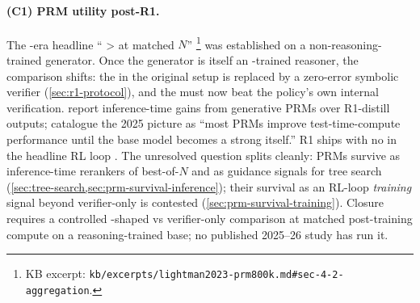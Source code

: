 \paragraph{(C1) PRM utility post-R1.}
The -era headline `` >  at matched $N$''
\citep[\S 4]{lightman2023-prm800k}\footnote{KB excerpt:
\texttt{kb/excerpts/lightman2023-prm800k.md\#sec-4-2-aggregation}.} was
established on a non-reasoning-trained generator. Once the generator is
itself an -trained reasoner, the comparison shifts: the  in the
original setup is replaced by a zero-error symbolic verifier
(\cref{sec:r1-protocol}), and the  must now beat the policy's own
internal verification.  report inference-time gains
from generative PRMs over R1-distill outputs;
\citet{zheng2025-prm-survey} catalogue the 2025 picture as ``most PRMs
improve test-time-compute performance until the base model becomes a
strong  itself.'' R1 ships with no  in the headline
RL loop \citep[\S 2.2]{deepseek-r1}. The unresolved question splits
cleanly: PRMs survive as inference-time rerankers of best-of-$N$ and as
guidance signals for tree search (\cref{sec:tree-search,sec:prm-survival-inference});
their survival as an RL-loop \emph{training} signal beyond
verifier-only  is contested
(\cref{sec:prm-survival-training}). Closure requires a controlled
-shaped  vs verifier-only  comparison at matched
post-training compute on a reasoning-trained base; no published 2025--26
study has run it.

